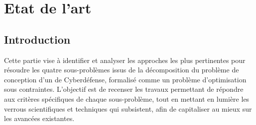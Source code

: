 \clearpage
\thispagestyle{empty}
\null
\newpage

\cleardoublepage
{}
\part{Etat de l'art}
\label{part:etat_art}

\clearpage
\thispagestyle{empty}
\null
\newpage


\chapter*{Introduction}

\noindent
Cette partie vise à identifier et analyser les approches les plus pertinentes pour résoudre les quatre sous-problèmes issus de la décomposition du problème de conception d'un  de Cyberdéfense, formalisé comme un problème d'optimisation sous contraintes. L'objectif est de recenser les travaux permettant de répondre aux critères spécifiques de chaque sous-problème, tout en mettant en lumière les verrous scientifiques et techniques qui subsistent, afin de capitaliser au mieux sur les avancées existantes.

